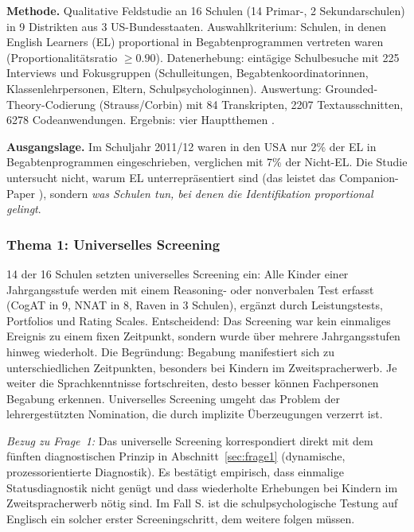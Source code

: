\documentclass[ngerman, a4paper]{article}
\begin{document}
\textbf{Methode.} Qualitative Feldstudie an 16 Schulen (14 Primar-, 2
Sekundarschulen) in 9 Distrikten aus 3 US-Bundesstaaten. Auswahlkriterium:
Schulen, in denen English Learners (EL) proportional in
Begabtenprogrammen vertreten waren (Proportionalitätsratio $\geq 0.90$).
Datenerhebung: eintägige Schulbesuche mit 225 Interviews und Fokusgruppen
(Schulleitungen, Begabtenkoordinatorinnen, Klassenlehrpersonen, Eltern,
Schulpsychologinnen). Auswertung: Grounded-Theory-Codierung
(Strauss/Corbin) mit 84 Transkripten, 2207 Textausschnitten, 6278
Codeanwendungen. Ergebnis: vier Hauptthemen
\parencite{gubbins2020promising}.

\textbf{Ausgangslage.} Im Schuljahr 2011/12 waren in den USA nur 2\% der
EL in Begabtenprogrammen eingeschrieben, verglichen mit 7\% der Nicht-EL.
Die Studie untersucht nicht, warum EL unterrepräsentiert sind (das leistet
das Companion-Paper \textcite{mun2020identifying}), sondern
\textit{was Schulen tun, bei denen die Identifikation proportional
gelingt}.

\subsubsection*{Thema 1: Universelles Screening}

14 der 16 Schulen setzten universelles Screening ein: Alle Kinder einer
Jahrgangsstufe werden mit einem Reasoning- oder nonverbalen Test erfasst
(CogAT in 9, NNAT in 8, Raven in 3 Schulen), ergänzt durch
Leistungstests, Portfolios und Rating Scales. Entscheidend: Das Screening
war kein einmaliges Ereignis zu einem fixen Zeitpunkt, sondern wurde über
mehrere Jahrgangsstufen hinweg wiederholt. Die Begründung: Begabung
manifestiert sich zu unterschiedlichen Zeitpunkten, besonders bei Kindern
im Zweitspracherwerb. Je weiter die Sprachkenntnisse fortschreiten, desto
besser können Fachpersonen Begabung erkennen. Universelles Screening
umgeht das Problem der lehrergestützten Nomination, die durch implizite
Überzeugungen verzerrt ist.

\textit{Bezug zu Frage~1:} Das universelle Screening korrespondiert
direkt mit dem fünften diagnostischen Prinzip in
Abschnitt~\ref{sec:frage1} (dynamische, prozessorientierte Diagnostik).
Es bestätigt empirisch, dass einmalige Statusdiagnostik nicht genügt
\parencite{lemas2023begriffsklaerung} und dass wiederholte Erhebungen bei
Kindern im Zweitspracherwerb nötig sind. Im Fall S. ist die
schulpsychologische Testung auf Englisch ein solcher erster
Screeningschritt, dem weitere folgen müssen.
\end{document}
